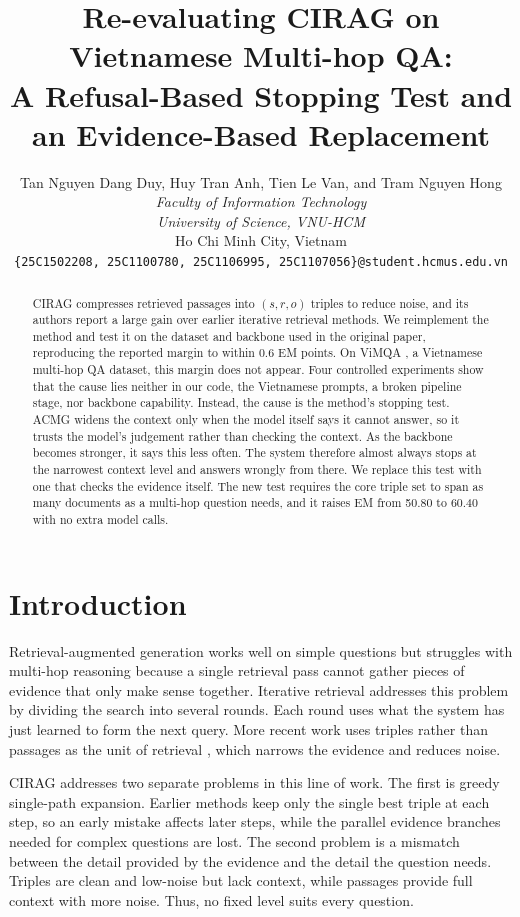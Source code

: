 \documentclass[11pt]{article}
\title{Re-evaluating CIRAG on Vietnamese Multi-hop QA:\\
       A Refusal-Based Stopping Test and an Evidence-Based Replacement}
\author{
  Tan Nguyen Dang Duy, Huy Tran Anh, Tien Le Van, and Tram Nguyen Hong \\
  \textit{Faculty of Information Technology} \\
  \textit{University of Science, VNU-HCM} \\
  Ho Chi Minh City, Vietnam \\
  \texttt{\{25C1502208, 25C1100780, 25C1106995, 25C1107056\}@student.hcmus.edu.vn}
}
\begin{document}
\maketitle

\begin{abstract}
CIRAG \citep{wei2026cirag} compresses retrieved passages into $(s,r,o)$ triples to reduce noise,
and its authors report a large gain over earlier iterative retrieval methods. We reimplement
the method and test it on the dataset and backbone used in the original paper, reproducing
the reported margin to within 0.6 EM points. On ViMQA \citep{le2022vimqa}, a Vietnamese
multi-hop QA dataset, this margin does not appear. Four controlled experiments show that the
cause lies neither in our code, the Vietnamese prompts, a broken pipeline stage, nor backbone
capability. Instead, the cause is the method's stopping test. ACMG widens the context only
when the model itself says it cannot answer, so it trusts the model's judgement rather than
checking the context. As the backbone becomes stronger, it says this less often. The system
therefore almost always stops at the narrowest context level and answers wrongly from there.
We replace this test with one that checks the evidence itself. The new test requires the core
triple set to span as many documents as a multi-hop question needs, and it raises EM from
50.80 to 60.40 with no extra model calls.
\end{abstract}

\section{Introduction}
\label{sec:intro}

Retrieval-augmented generation \citep{lewis2020rag} works well on simple questions but
struggles with multi-hop reasoning because a single retrieval pass cannot gather pieces of
evidence that only make sense together. Iterative retrieval \citep{trivedi2023ircot} addresses
this problem by dividing the search into several rounds. Each round uses what the system has
just learned to form the next query. More recent work uses triples rather than passages as
the unit of retrieval \citep{fang2024trace, fang2025kirag}, which narrows the evidence and
reduces noise.

CIRAG \citep{wei2026cirag} addresses two separate problems in this line of work. The first is
greedy single-path expansion. Earlier methods keep only the single best triple at each step,
so an early mistake affects later steps, while the parallel evidence branches needed for
complex questions are lost. The second problem is a mismatch between the detail provided by
the evidence and the detail the question needs. Triples are clean and low-noise but lack
context, while passages provide full context with more noise. Thus, no fixed level suits
every question.
\end{document}
